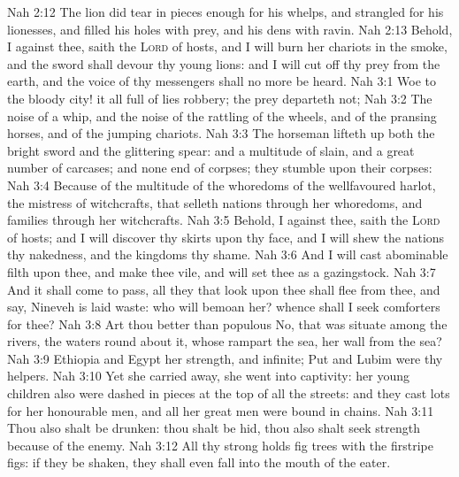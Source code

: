 \vs Nah 2:12 The lion did tear in pieces enough for his whelps, and strangled for his lionesses, and filled his holes with prey, and his dens with ravin.
\vs Nah 2:13 Behold, I  against thee, saith the \textsc{Lord} of hosts, and I will burn her chariots in the smoke, and the sword shall devour thy young lions: and I will cut off thy prey from the earth, and the voice of thy messengers shall no more be heard.
\vs Nah 3:1 Woe to the bloody city! it  all full of lies  robbery; the prey departeth not;
\vs Nah 3:2 The noise of a whip, and the noise of the rattling of the wheels, and of the pransing horses, and of the jumping chariots.
\vs Nah 3:3 The horseman lifteth up both the bright sword and the glittering spear: and  a multitude of slain, and a great number of carcases; and  none end of  corpses; they stumble upon their corpses:
\vs Nah 3:4 Because of the multitude of the whoredoms of the wellfavoured harlot, the mistress of witchcrafts, that selleth nations through her whoredoms, and families through her witchcrafts.
\vs Nah 3:5 Behold, I  against thee, saith the \textsc{Lord} of hosts; and I will discover thy skirts upon thy face, and I will shew the nations thy nakedness, and the kingdoms thy shame.
\vs Nah 3:6 And I will cast abominable filth upon thee, and make thee vile, and will set thee as a gazingstock.
\vs Nah 3:7 And it shall come to pass,  all they that look upon thee shall flee from thee, and say, Nineveh is laid waste: who will bemoan her? whence shall I seek comforters for thee?
\vs Nah 3:8 Art thou better than populous No, that was situate among the rivers,  the waters round about it, whose rampart  the sea,  her wall  from the sea?
\vs Nah 3:9 Ethiopia and Egypt  her strength, and  infinite; Put and Lubim were thy helpers.
\vs Nah 3:10 Yet  she carried away, she went into captivity: her young children also were dashed in pieces at the top of all the streets: and they cast lots for her honourable men, and all her great men were bound in chains.
\vs Nah 3:11 Thou also shalt be drunken: thou shalt be hid, thou also shalt seek strength because of the enemy.
\vs Nah 3:12 All thy strong holds  fig trees with the firstripe figs: if they be shaken, they shall even fall into the mouth of the eater.
